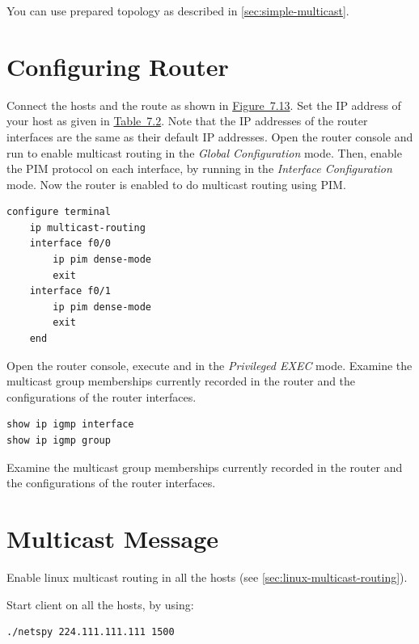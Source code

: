 \documentclass{../UTNetLab}
\begin{document}
You can use prepared topology as described in \autoref{sec:simple-multicast}.

\section{Configuring Router}
\label{sec:config-router}
Connect the hosts and the route as shown in \hyperref[fig:7.13]{Figure~7.13}.
Set the IP address of your host as given in \hyperref[tab:7.2]{Table~7.2}.
Note that the IP addresses of the router interfaces are the same as their default IP addresses.
Open the router console and run  to enable multicast routing in the \textit{Global Configuration} mode.
Then, enable the PIM protocol on each interface, by running  in the \textit{Interface Configuration} mode.
Now the router is enabled to do multicast routing using PIM.

\begin{lstlisting}
configure terminal
    ip multicast-routing
    interface f0/0
        ip pim dense-mode
        exit
    interface f0/1
        ip pim dense-mode
        exit
    end
\end{lstlisting}

Open the router console, execute  and  in the \textit{Privileged EXEC} mode.
Examine the multicast group memberships currently recorded in the router and the configurations of the router interfaces.

\begin{lstlisting}
show ip igmp interface
show ip igmp group
\end{lstlisting}

\begin{report}
    \item Examine the multicast group memberships currently recorded in the router and the configurations of the router interfaces.
\end{report}

\section{Multicast Message}
Enable linux multicast routing in all the hosts (see \autoref{sec:linux-multicast-routing}).

Start  client on all the hosts, by using:
\begin{lstlisting}
./netspy 224.111.111.111 1500
\end{lstlisting}
\end{document}
